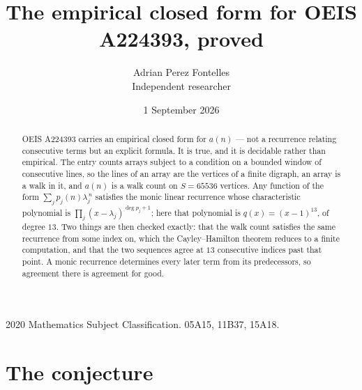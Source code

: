 \documentclass[11pt,a4paper]{article}
\title{The empirical closed form for OEIS A224393, proved}
\author{Adrian Perez Fontelles\\ \small Independent researcher}
\date{1 September 2026}
\theoremstyle{plain}
\theoremstyle{definition}
\begin{document}
\maketitle

\begin{abstract}
OEIS A224393 carries an empirical closed form for $a(n)$ --- not a recurrence relating
consecutive terms but an explicit formula. It is true, and it is decidable rather than
empirical. The entry counts arrays subject to a condition on a bounded window of consecutive lines, so the lines of an array are the
vertices of a finite digraph, an array is a walk in it, and $a(n)$ is a walk count on
$S=65536$ vertices. Any function of the form $\sum_j p_j(n)\lambda_j^{\,n}$ satisfies the
monic linear recurrence whose characteristic polynomial is
$\prod_j(x-\lambda_j)^{\deg p_j+1}$; here that polynomial is $q(x)=(x-1)^{13}$, of degree
$13$. Two things are then checked exactly: that the walk count satisfies the same
recurrence from some index on, which the Cayley--Hamilton theorem reduces to a finite
computation, and that the two sequences agree at $13$ consecutive indices past that
point. A monic recurrence determines every later term from its predecessors, so agreement
there is agreement for good.
\end{abstract}

\noindent\small 2020 Mathematics Subject Classification. 05A15, 11B37, 15A18.\normalsize

\section{The conjecture}
\end{document}
